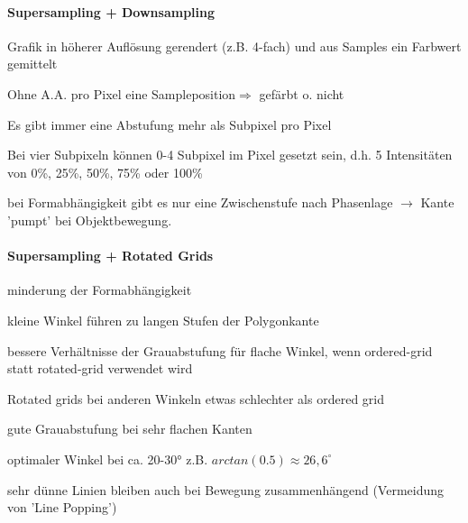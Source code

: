 \documentclass[landscape]{article}
\begin{document}
\begin{multicols}{3}
  \paragraph{Supersampling + Downsampling}
  \begin{itemize*}
    \item Grafik in höherer Auflösung gerendert (z.B. 4-fach) und aus Samples ein Farbwert gemittelt
    \item Ohne A.A. pro Pixel eine Sampleposition$\Rightarrow$ gefärbt o. nicht
    \item Es gibt immer eine Abstufung mehr als Subpixel pro Pixel
    \item Bei vier Subpixeln können 0-4 Subpixel im Pixel gesetzt sein, d.h. 5 Intensitäten von 0\%, 25\%, 50\%, 75\% oder 100\%
    \item bei Formabhängigkeit gibt es nur eine Zwischenstufe nach Phasenlage $\rightarrow$ Kante 'pumpt' bei Objektbewegung.
  \end{itemize*}
  
  \paragraph{Supersampling + Rotated Grids}
  \begin{itemize*}
    \item minderung der Formabhängigkeit
    \item kleine Winkel führen zu langen Stufen der Polygonkante
    \item bessere Verhältnisse der Grauabstufung für flache Winkel, wenn ordered-grid statt rotated-grid verwendet wird
    \item Rotated grids bei anderen Winkeln etwas schlechter als ordered grid
    \item gute Grauabstufung bei sehr flachen Kanten
    \item optimaler Winkel bei ca. 20-30° z.B. $arctan(0.5) \approx 26,6^{\circ}$
    \item sehr dünne Linien bleiben auch bei Bewegung zusammenhängend (Vermeidung von 'Line Popping')
  \end{itemize*}
  

\end{multicols}
\end{document}
